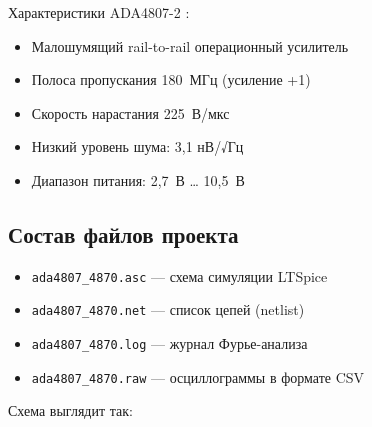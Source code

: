 \documentclass[a4paper, 12pt]{article}
\begin{document}
Характеристики ADA4807-2 \cite{ADA4807_ds}:
\begin{itemize}
  \item Малошумящий rail-to-rail операционный усилитель
  \item Полоса пропускания 180~МГц (усиление +1)
  \item Скорость нарастания 225~В/мкс
  \item Низкий уровень шума: 3,1 нВ/√Гц
  \item Диапазон питания: 2,7~В … 10,5~В
\end{itemize}

\subsection{Состав файлов проекта}

\begin{itemize}
  \item \texttt{ada4807\_4870.asc} --- схема симуляции LTSpice
  \item \texttt{ada4807\_4870.net} --- список цепей (netlist)
  \item \texttt{ada4807\_4870.log} --- журнал Фурье-анализа
  \item \texttt{ada4807\_4870.raw} --- осциллограммы в формате CSV
\end{itemize}

\par Схема выглядит так:
\end{document}
